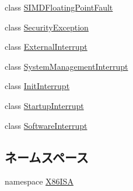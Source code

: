 \begin{DoxyCompactItemize}
class \hyperlink{classX86ISA_1_1SIMDFloatingPointFault}{SIMDFloatingPointFault}
\item 
class \hyperlink{classX86ISA_1_1SecurityException}{SecurityException}
\item 
class \hyperlink{classX86ISA_1_1ExternalInterrupt}{ExternalInterrupt}
\item 
class \hyperlink{classX86ISA_1_1SystemManagementInterrupt}{SystemManagementInterrupt}
\item 
class \hyperlink{classX86ISA_1_1InitInterrupt}{InitInterrupt}
\item 
class \hyperlink{classX86ISA_1_1StartupInterrupt}{StartupInterrupt}
\item 
class \hyperlink{classX86ISA_1_1SoftwareInterrupt}{SoftwareInterrupt}
\end{DoxyCompactItemize}
\subsection*{ネームスペース}
\begin{DoxyCompactItemize}
\item 
namespace \hyperlink{namespaceX86ISA}{X86ISA}
\end{DoxyCompactItemize}

